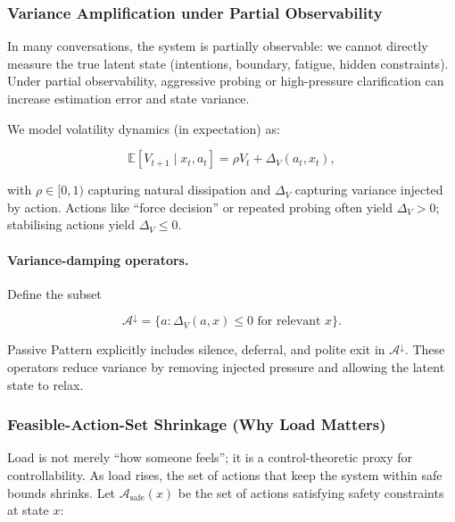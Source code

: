 \subsubsection{Variance Amplification under Partial Observability}
\label{sec:pp-variance-amplification}

In many conversations, the system is partially observable: we cannot
directly measure the true latent state (intentions, boundary,
fatigue, hidden constraints). Under partial observability,
aggressive probing or high-pressure clarification can increase
estimation error and state variance.

We model volatility dynamics (in expectation) as:

\begin{equation}
\mathbb{E}[V_{t+1} \mid x_t, a_t] = \rho V_t + \Delta_V(a_t, x_t),
\label{eq:pp-volatility-dynamics}
\end{equation}

with $\rho \in [0, 1)$ capturing natural dissipation and $\Delta_V$
capturing variance injected by action. Actions like ``force
decision'' or repeated probing often yield $\Delta_V > 0$; stabilising
actions yield $\Delta_V \le 0$.

\paragraph{Variance-damping operators.}
Define the subset

\begin{equation}
\mathcal{A}^{\downarrow} = \{a : \Delta_V(a, x) \le 0
\text{ for relevant } x\}.
\label{eq:pp-variance-damping}
\end{equation}

Passive Pattern explicitly includes silence, deferral, and polite
exit in $\mathcal{A}^{\downarrow}$. These operators reduce variance
by removing injected pressure and allowing the latent state to
relax.

\subsubsection{Feasible-Action-Set Shrinkage (Why Load Matters)}
\label{sec:pp-feasible-action-set}

Load is not merely ``how someone feels''; it is a control-theoretic
proxy for controllability. As load rises, the set of actions that
keep the system within safe bounds shrinks. Let
$\mathcal{A}_{\mathrm{safe}}(x)$ be the set of actions satisfying
safety constraints at state $x$:

